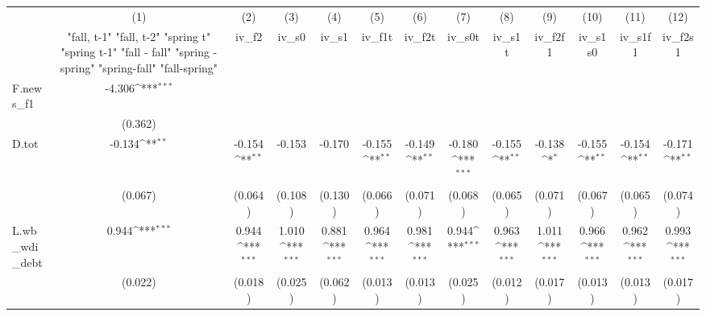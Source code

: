 {
\def\sym#1{\ifmmode^{#1}\else\(^{#1}\)\fi}
\begin{tabular}{l*{12}{c}}
\toprule
            &\multicolumn{1}{c}{(1)}&\multicolumn{1}{c}{(2)}&\multicolumn{1}{c}{(3)}&\multicolumn{1}{c}{(4)}&\multicolumn{1}{c}{(5)}&\multicolumn{1}{c}{(6)}&\multicolumn{1}{c}{(7)}&\multicolumn{1}{c}{(8)}&\multicolumn{1}{c}{(9)}&\multicolumn{1}{c}{(10)}&\multicolumn{1}{c}{(11)}&\multicolumn{1}{c}{(12)}\\
            &\multicolumn{1}{c}{  "fall, t-1" "fall, t-2" "spring t" "spring t-1"  "fall - fall" "spring - spring" "spring-fall" "fall-spring" }&\multicolumn{1}{c}{iv\_f2}&\multicolumn{1}{c}{iv\_s0}&\multicolumn{1}{c}{iv\_s1}&\multicolumn{1}{c}{iv\_f1t}&\multicolumn{1}{c}{iv\_f2t}&\multicolumn{1}{c}{iv\_s0t}&\multicolumn{1}{c}{iv\_s1t}&\multicolumn{1}{c}{iv\_f2f1}&\multicolumn{1}{c}{iv\_s1s0}&\multicolumn{1}{c}{iv\_s1f1}&\multicolumn{1}{c}{iv\_f2s1}\\
\midrule
F.news\_f1   &      -4.306\sym{***}&                     &                     &                     &                     &                     &                     &                     &                     &                     &                     &                     \\
            &     (0.362)         &                     &                     &                     &                     &                     &                     &                     &                     &                     &                     &                     \\
\addlinespace
D.tot       &      -0.134\sym{**} &      -0.154\sym{**} &      -0.153         &      -0.170         &      -0.155\sym{**} &      -0.149\sym{**} &      -0.180\sym{***}&      -0.155\sym{**} &      -0.138\sym{*}  &      -0.155\sym{**} &      -0.154\sym{**} &      -0.171\sym{**} \\
            &     (0.067)         &     (0.064)         &     (0.108)         &     (0.130)         &     (0.066)         &     (0.071)         &     (0.068)         &     (0.065)         &     (0.071)         &     (0.067)         &     (0.065)         &     (0.074)         \\
\addlinespace
L.wb\_wdi\_debt&       0.944\sym{***}&       0.944\sym{***}&       1.010\sym{***}&       0.881\sym{***}&       0.964\sym{***}&       0.981\sym{***}&       0.944\sym{***}&       0.963\sym{***}&       1.011\sym{***}&       0.966\sym{***}&       0.962\sym{***}&       0.993\sym{***}\\
            &     (0.022)         &     (0.018)         &     (0.025)         &     (0.062)         &     (0.013)         &     (0.013)         &     (0.025)         &     (0.012)         &     (0.017)         &     (0.013)         &     (0.013)         &     (0.017)         \\

\end{tabular}}
